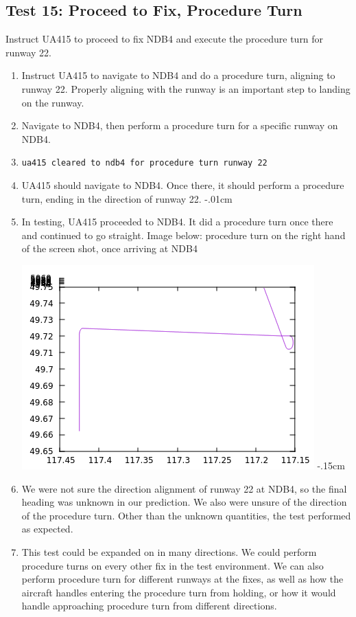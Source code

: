 \documentclass[letterpaper, 12pt]{article}
\begin{document}
\subsection{Test 15: Proceed to Fix, Procedure Turn}
Instruct UA415 to proceed to fix NDB4 and execute the procedure turn for runway 22.
\begin{enumerate}\itemsep-.15cm
\item Instruct UA415 to navigate to NDB4 and do a procedure turn, aligning to runway 22. Properly aligning with the runway is an important step to landing on the runway.
\item Navigate to NDB4, then perform a procedure turn for a specific runway on NDB4.
\item \verb!ua415 cleared to ndb4 for procedure turn runway 22!
\item UA415 should navigate to NDB4. Once there, it should perform a procedure turn, ending in the direction of runway 22.
\itemsep-.01cm
\item In testing, UA415 proceeded to NDB4. It did a procedure turn once there and continued to go straight. Image below: procedure turn on the right hand of the screen shot, once arriving at NDB4

    \includegraphics[scale=.6,valign=t,center]{test15_1.png}
\itemsep-.15cm
\item We were not sure the direction alignment of runway 22 at NDB4, so the final heading was unknown in our prediction. We also were unsure of the direction of the procedure turn. Other than the unknown quantities, the test performed as expected.
\item This test could be expanded on in many directions. We could perform procedure turns on every other fix in the test environment. We can also perform procedure turn for different runways at the fixes, as well as how the aircraft handles entering the procedure turn from holding, or how it would handle approaching procedure turn from different directions.
\end{enumerate}
\end{document}
